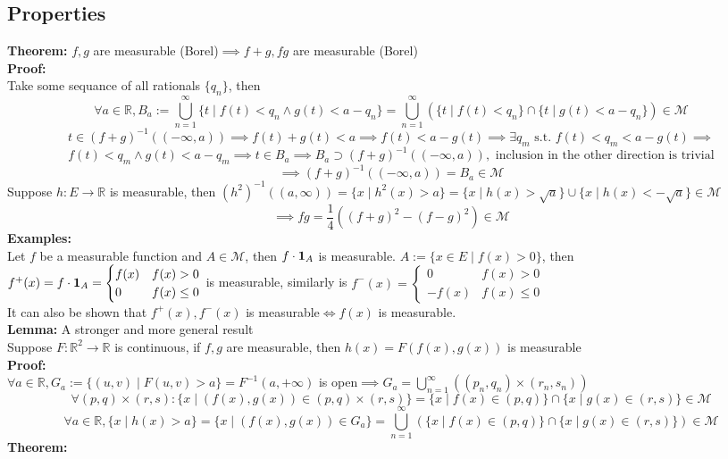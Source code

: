 \documentclass{article}
\newcommand{\R}{\mathbb{R}}
\newcommand{\cupninf}{\displaystyle\bigcup_{n=1}^\infty}
\newcommand{\st}{\mbox{ s.t. }}
\newcommand{\0}{{\bf{0}}}
\newcommand{\1}{{\bf{1}}}
\begin{document}
\subsection{Properties}
\textbf{Theorem:} $f,g$ are measurable (Borel)$\implies f+g,fg$ are measurable (Borel)\\
\textbf{Proof:}\\
Take some sequance of all rationals $\{q_n\}$, then
$$\forall a\in\R,B_a:=\cupninf\{t\mid f(t)<q_n\land g(t)<a-q_n\}=\cupninf(\{t\mid f(t)<q_n\}\cap\{t\mid g(t)<a-q_n\})\in\mathcal{M}$$
$$t\in (f+g)^{-1}((-\infty,a))\implies f(t)+g(t)<a\implies f(t)<a-g(t)\implies\exists q_m\st f(t)<q_m<a-g(t)\implies$$
$$f(t)<q_m\land g(t)<a-q_m\implies t\in B_a\implies B_a\supset(f+g)^{-1}((-\infty,a)),\mbox{ inclusion in the other direction is trivial}$$
$$\implies (f+g)^{-1}((-\infty,a))=B_a\in\mathcal{M}$$
Suppose $h:E\to\R$ is measurable, then $\left(h^2\right)^{-1}((a,\infty))=\{x\mid h^2(x)>a\}=\{x\mid h(x)>\sqrt{a}\}\cup\{x\mid h(x)<-\sqrt{a}\}\in\mathcal{M}$
$$\implies fg=\frac{1}{4}\left((f+g)^2-(f-g)^2\right)\in\mathcal{M}$$
\textbf{Examples:}\\
Let $f$ be a measurable function and $A\in\mathcal{M}$, then $f\cdot\1_A$ is measurable. $A:=\{x\in E\mid f(x)>0\}$, then\\
$f^+(x)=f\cdot\1_A=\begin{cases}
    f(x)&f(x)>0\\
    0&f(x)\le0
\end{cases}$ is measurable, similarly is $f^-(x)=\begin{cases}
    0&f(x)>0\\
    -f(x)&f(x)\le0
\end{cases}$\\
It can also be shown that $f^+(x),f^-(x)$ is measurable$\iff f(x)$ is measurable.\\
\textbf{Lemma:} A stronger and more general result\\
Suppose $F:\R^2\to\R$ is continuous, if $f,g$ are measurable, then $h(x)=F(f(x),g(x))$ is measurable\\
\textbf{Proof:}\\
$\forall a\in\R,G_a:=\{(u,v)\mid F(u,v)>a\}=F^{-1}(a,+\infty)$ is open$\implies G_a=\cupninf((p_n,q_n)\times(r_n,s_n))$
$$\forall (p,q)\times(r,s):\{x\mid (f(x),g(x))\in(p,q)\times(r,s)\}=\{x\mid f(x)\in(p,q)\}\cap\{x\mid g(x)\in(r,s)\}\in\mathcal{M}$$
$$\forall a\in\R,\{x\mid h(x)>a\}=\{x\mid (f(x),g(x))\in G_a\}=\cupninf(\{x\mid f(x)\in(p,q)\}\cap\{x\mid g(x)\in(r,s)\})\in\mathcal{M}$$
\textbf{Theorem:}\\
\end{document}
